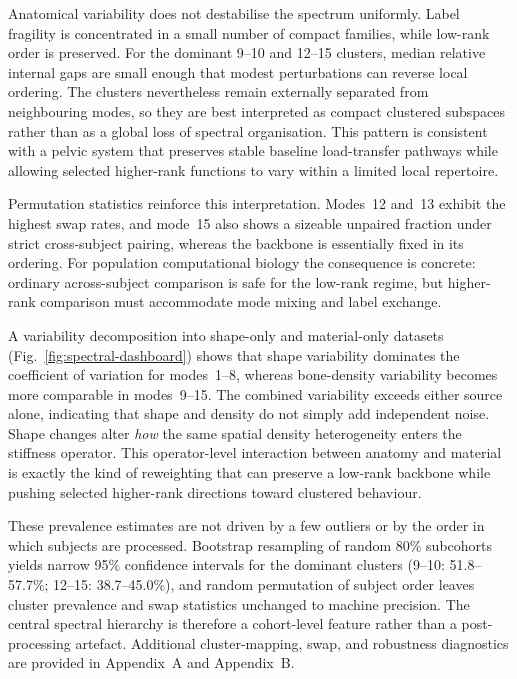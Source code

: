 \documentclass[11pt]{article}
\begin{document}
Anatomical variability does not destabilise the spectrum uniformly.
Label fragility is concentrated in a small number of compact families, while low-rank order is preserved.
For the dominant 9--10 and 12--15 clusters, median relative internal gaps are small enough that modest perturbations can reverse local ordering.
The clusters nevertheless remain externally separated from neighbouring modes, so they are best interpreted as compact clustered subspaces rather than as a global loss of spectral organisation.
This pattern is consistent with a pelvic system that preserves stable baseline load-transfer pathways while allowing selected higher-rank functions to vary within a limited local repertoire.

Permutation statistics reinforce this interpretation.
Modes~12 and~13 exhibit the highest swap rates, and mode~15 also shows a sizeable unpaired fraction under strict cross-subject pairing, whereas the backbone is essentially fixed in its ordering.
For population computational biology the consequence is concrete: ordinary across-subject comparison is safe for the low-rank regime, but higher-rank comparison must accommodate mode mixing and label exchange.

A variability decomposition into shape-only and material-only datasets (Fig.~\ref{fig:spectral-dashboard}) shows that shape variability dominates the coefficient of variation for modes~1--8, whereas bone-density variability becomes more comparable in modes~9--15.
The combined variability exceeds either source alone, indicating that shape and density do not simply add independent noise.
Shape changes alter \emph{how} the same spatial density heterogeneity enters the stiffness operator.
This operator-level interaction between anatomy and material is exactly the kind of reweighting that can preserve a low-rank backbone while pushing selected higher-rank directions toward clustered behaviour.

These prevalence estimates are not driven by a few outliers or by the order in which subjects are processed.
Bootstrap resampling of random 80\% subcohorts yields narrow 95\% confidence intervals for the dominant clusters (9--10: 51.8--57.7\%; 12--15: 38.7--45.0\%), and random permutation of subject order leaves cluster prevalence and swap statistics unchanged to machine precision.
The central spectral hierarchy is therefore a cohort-level feature rather than a post-processing artefact.
Additional cluster-mapping, swap, and robustness diagnostics are provided in Appendix~A and Appendix~B.
\end{document}

